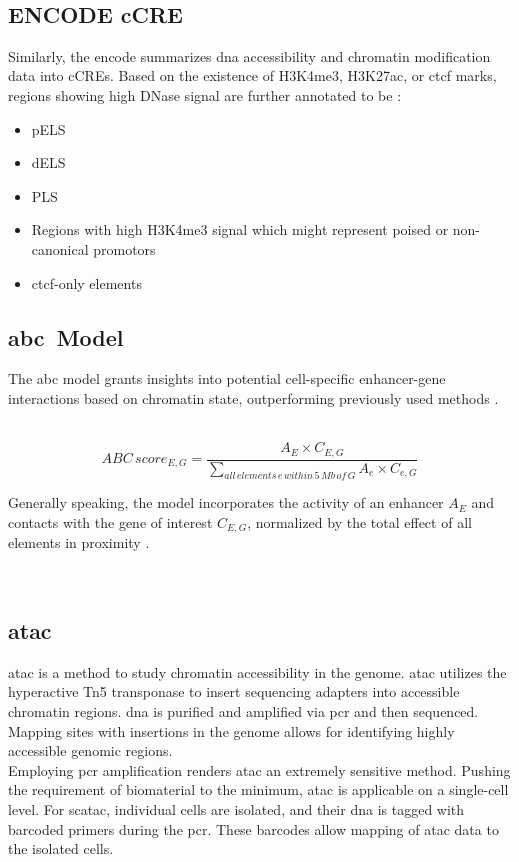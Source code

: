     \subsection{ENCODE \acs{cCRE}}
    Similarly, the \ac{encode} summarizes \ac{dna} accessibility and chromatin modification data into \acfp{cCRE}. Based on the existence of \ac{H3K4me3}, \ac{H3K27ac}, or \ac{ctcf} marks, regions showing high DNase signal are further annotated to be \cite{mooreExpandedEncyclopaediasDNA2020}:
    \begin{itemize}
        \item \ac{pELS}
        \item \ac{dELS}
        \item \ac{PLS}
        \item Regions with high \ac{H3K4me3} signal which might represent poised or non-canonical promotors
        \item \ac{ctcf}-only elements
    \end{itemize}

    \subsection{\acs{abc} Model}
    The \acf{abc} model grants insights into potential cell-specific enhancer-gene interactions based on chromatin state, outperforming previously used methods \cite{fulcoActivitybycontactModelEnhancer2019a, nasserGenomewideEnhancerMaps2021a}.

        $$ ABC\,score_{E, G} = \frac{A_E \times C_{E,G}}{\sum\limits_{all\,elements\,e\,within\,5\,Mb\,of\,G} A_e \times C_{e, G}} $$

    Generally speaking, the model incorporates the activity of an enhancer $A_E$ and contacts with the gene of interest $C_{E,G}$, normalized by the total effect of all elements in proximity \cite{fulcoActivitybycontactModelEnhancer2019a, nasserGenomewideEnhancerMaps2021a}.

    \subsection{\acs{atac}}
    \Acf{atac} is a method to study chromatin accessibility in the genome. \Ac{atac} utilizes the hyperactive Tn5 transponase to insert sequencing adapters into accessible chromatin regions. \ac{dna} is purified and amplified via \ac{pcr} and then sequenced. Mapping sites with insertions in the genome allows for identifying highly accessible genomic regions. \cite{buenrostroTranspositionNativeChromatin2013, buenrostroATACseqMethodAssaying2015}\\
    Employing \ac{pcr} amplification renders \ac{atac} an extremely sensitive method. Pushing the requirement of biomaterial to the minimum, \ac{atac} is applicable on a single-cell level. For sc\ac{atac}, individual cells are isolated, and their \ac{dna} is tagged with barcoded primers during the \ac{pcr}. These barcodes allow mapping of \ac{atac} data to the isolated cells. \cite{buenrostroSinglecellChromatinAccessibility2015}

